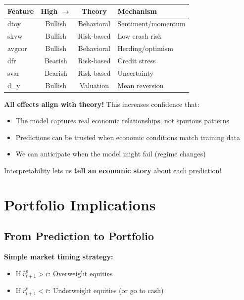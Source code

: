 \documentclass[11pt,a4paper]{article}
\newcommand{\keyword}[1]{\textbf{\textcolor{AccentOrange}{#1}}}
\begin{document}
\begin{center}
\begin{tabular}{lccp{3.5cm}}
    \toprule
    \textbf{Feature} & \textbf{High $\rightarrow$} & \textbf{Theory} & \textbf{Mechanism} \\
    \midrule
    dtoy & Bullish & Behavioral & Sentiment/momentum \\
    skvw & Bullish & Risk-based & Low crash risk \\
    avgcor & Bullish & Behavioral & Herding/optimism \\
    dfr & Bearish & Risk-based & Credit stress \\
    svar & Bearish & Risk-based & Uncertainty \\
    d\_y & Bullish & Valuation & Mean reversion \\
    \bottomrule
\end{tabular}
\end{center}

\textbf{All effects align with theory!} This increases confidence that:
\begin{itemize}
    \item The model captures real economic relationships, not spurious patterns
    \item Predictions can be trusted when economic conditions match training data
    \item We can anticipate when the model might fail (regime changes)
\end{itemize}

Interpretability lets us \keyword{tell an economic story} about each prediction!

\section{Portfolio Implications}

\subsection{From Prediction to Portfolio}

\textbf{Simple market timing strategy:}
\begin{itemize}
    \item If $\hat{r}_{t+1}^e > \bar{r}$: Overweight equities
    \item If $\hat{r}_{t+1}^e < \bar{r}$: Underweight equities (or go to cash)
\end{itemize}
\end{document}
